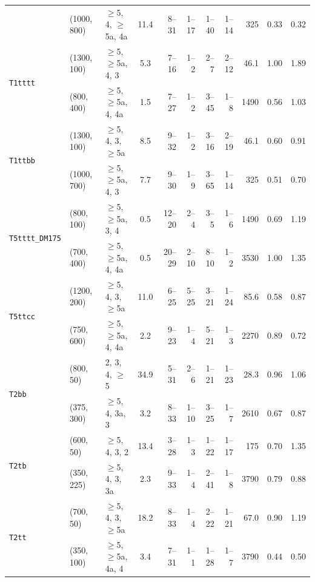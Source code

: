 \begin{table}[!t]
{\begin{tabular}{ lllcrrrrrcc }
 & (1000, 800) & $\geq$5, 4, $\geq$5a, 4a & 11.4           & 8--31  & 1--17   & 1--40 & 1--14 & 325  & 0.33 & 0.32 \\ [0.5ex]
      \multirow{2}{*}{\texttt{T1tttt}}
 & (1300, 100) & $\geq$5, $\geq$5a, 4, 3  & \phantom{1}5.3 & 7--16  & 1--2    & 2--7  & 2--12 & 46.1 & 1.00 & 1.89 \\
 & (800, 400)  & $\geq$5, $\geq$5a, 4, 4a & \phantom{1}1.5 & 7--27  & 1--2    & 3--45 & 1--8  & 1490 & 0.56 & 1.03 \\ [0.5ex]
      \multirow{2}{*}{\texttt{T1ttbb}}
 & (1300, 100) & $\geq$5, 4, 3, $\geq$5a  & \phantom{1}8.5 & 9--32  & 1--2    & 3--16 & 2--19 & 46.1 & 0.60 & 0.91 \\
 & (1000, 700) & $\geq$5, $\geq$5a, 4, 3  & \phantom{1}7.7 & 9--30  & 1--9    & 3--65 & 1--14 & 325  & 0.51 & 0.70 \\ [0.5ex]
      \multirow{2}{*}{\texttt{T5tttt\_DM175}}
 & (800, 100)  & $\geq$5, $\geq$5a, 3, 4  & \phantom{1}0.5 & 12--20 & 2--4    & 3--5  & 1--6  & 1490 & 0.69 & 1.19 \\
 & (700, 400)  & $\geq$5, $\geq$5a, 4, 4a & \phantom{1}0.5 & 20--29 & 2--10   & 8--10 & 1--2  & 3530 & 1.00 & 1.35 \\ [0.5ex]
      \multirow{2}{*}{\texttt{T5ttcc}}
 & (1200, 200) & $\geq$5, 4, 3, $\geq$5a  & 11.0           & 6--25  & 5--25   & 3--21 & 1--24 & 85.6 & 0.58 & 0.87 \\
 & (750, 600)  & $\geq$5, $\geq$5a, 4, 4a & \phantom{1}2.2 & 9--23  & 1--4    & 5--21 & 1--3  & 2270 & 0.89 & 0.72 \\ [0.5ex]
      \multirow{2}{*}{\texttt{T2bb}}
 & (800, 50)   & 2, 3, 4, $\geq$5         & 34.9           & 5--31  & 2--6    & 1--21 & 1--23 & 28.3 & 0.96 & 1.06 \\
 & (375, 300)  & $\geq$5, 4, 3a, 3        & \phantom{1}3.2 & 8--33  & 1--10   & 3--25 & 1--7  & 2610 & 0.67 & 0.87 \\ [0.5ex]
      \multirow{2}{*}{\texttt{T2tb}}
 & (600, 50)   & $\geq$5, 4, 3, 2         & 13.4           & 3--28  & 1--3    & 1--22 & 1--17 & 175  & 0.70 & 1.35 \\
 & (350, 225)  & $\geq$5, 4, 3, 3a        & \phantom{1}2.3 & 9--33  & 1--4    & 2--41 & 1--8  & 3790 & 0.79 & 0.88 \\ [0.5ex]
      \multirow{2}{*}{\texttt{T2tt}}
 & (700, 50)   & $\geq$5, 4, 3, $\geq$5a  & 18.2           & 8--33  & 1--4    & 2--22 & 1--21 & 67.0 & 0.90 & 1.19 \\
 & (350, 100)  & $\geq$5, $\geq$5a, 4a, 4 & \phantom{1}3.4 & 7--31  & 1--1    & 1--28 & 1--7  & 3790 & 0.44 & 0.50 \\ [0.5ex]

\end{tabular}}
\end{table}
